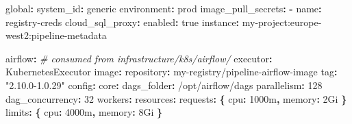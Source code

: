 \documentclass[
  11pt,
  british,
  oneside]{book}
\newenvironment{Shaded}{\begin{snugshade}}{\end{snugshade}}
\newcommand{\AttributeTok}[1]{\textcolor[rgb]{0.77,0.63,0.00}{#1}}
\newcommand{\CharTok}[1]{\textcolor[rgb]{0.31,0.60,0.02}{#1}}
\newcommand{\CommentTok}[1]{\textcolor[rgb]{0.56,0.35,0.01}{\textit{#1}}}
\newcommand{\DecValTok}[1]{\textcolor[rgb]{0.00,0.00,0.81}{#1}}
\newcommand{\FunctionTok}[1]{\textcolor[rgb]{0.00,0.00,0.00}{#1}}
\newcommand{\KeywordTok}[1]{\textcolor[rgb]{0.13,0.29,0.53}{\textbf{#1}}}
\newcommand{\StringTok}[1]{\textcolor[rgb]{0.31,0.60,0.02}{#1}}
\begin{document}
\begin{Shaded}
\begin{Highlighting}[]
\FunctionTok{global}\KeywordTok{:}
\AttributeTok{  }\FunctionTok{system\_id}\KeywordTok{:}\AttributeTok{ generic}
\AttributeTok{  }\FunctionTok{environment}\KeywordTok{:}\AttributeTok{ prod}
\AttributeTok{  }\FunctionTok{image\_pull\_secrets}\KeywordTok{:}
\AttributeTok{    }\KeywordTok{{-}}\AttributeTok{ }\FunctionTok{name}\KeywordTok{:}\AttributeTok{ registry{-}creds}
\AttributeTok{  }\FunctionTok{cloud\_sql\_proxy}\KeywordTok{:}
\AttributeTok{    }\FunctionTok{enabled}\KeywordTok{:}\AttributeTok{ }\CharTok{true}
\AttributeTok{    }\FunctionTok{instance}\KeywordTok{:}\AttributeTok{ my{-}project:europe{-}west2:pipeline{-}metadata}

\FunctionTok{airflow}\KeywordTok{:}\CommentTok{                                 \# consumed from infrastructure/k8s/airflow/}
\AttributeTok{  }\FunctionTok{executor}\KeywordTok{:}\AttributeTok{ KubernetesExecutor}
\AttributeTok{  }\FunctionTok{image}\KeywordTok{:}
\AttributeTok{    }\FunctionTok{repository}\KeywordTok{:}\AttributeTok{ my{-}registry/pipeline{-}airflow{-}image}
\AttributeTok{      }\FunctionTok{tag}\KeywordTok{:}\AttributeTok{ }\StringTok{"2.10.0{-}1.0.29"}
\AttributeTok{    }\FunctionTok{config}\KeywordTok{:}
\AttributeTok{      }\FunctionTok{core}\KeywordTok{:}
\AttributeTok{        }\FunctionTok{dags\_folder}\KeywordTok{:}\AttributeTok{ /opt/airflow/dags}
\AttributeTok{        }\FunctionTok{parallelism}\KeywordTok{:}\AttributeTok{ }\DecValTok{128}
\AttributeTok{        }\FunctionTok{dag\_concurrency}\KeywordTok{:}\AttributeTok{ }\DecValTok{32}
\AttributeTok{    }\FunctionTok{workers}\KeywordTok{:}
\AttributeTok{      }\FunctionTok{resources}\KeywordTok{:}
\AttributeTok{        }\FunctionTok{requests}\KeywordTok{:}\AttributeTok{ }\KeywordTok{\{}\AttributeTok{ }\FunctionTok{cpu}\KeywordTok{:}\AttributeTok{ 1000m}\KeywordTok{,}\AttributeTok{ }\FunctionTok{memory}\KeywordTok{:}\AttributeTok{ 2Gi }\KeywordTok{\}}
\AttributeTok{        }\FunctionTok{limits}\KeywordTok{:}\AttributeTok{   }\KeywordTok{\{}\AttributeTok{ }\FunctionTok{cpu}\KeywordTok{:}\AttributeTok{ 4000m}\KeywordTok{,}\AttributeTok{ }\FunctionTok{memory}\KeywordTok{:}\AttributeTok{ 8Gi }\KeywordTok{\}}


\end{Highlighting}
\end{Shaded}
\end{document}
